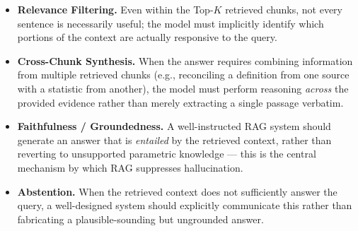 \documentclass[11pt,a4paper]{article}
\begin{document}
\begin{itemize}
  \item \textbf{Relevance Filtering.} Even within the Top-$K$ retrieved chunks, not every sentence is necessarily useful; the model must implicitly identify which portions of the context are actually responsive to the query.
  \item \textbf{Cross-Chunk Synthesis.} When the answer requires combining information from multiple retrieved chunks (e.g., reconciling a definition from one source with a statistic from another), the model must perform reasoning \emph{across} the provided evidence rather than merely extracting a single passage verbatim.
  \item \textbf{Faithfulness / Groundedness.} A well-instructed RAG system should generate an answer that is \emph{entailed} by the retrieved context, rather than reverting to unsupported parametric knowledge --- this is the central mechanism by which RAG suppresses hallucination.
  \item \textbf{Abstention.} When the retrieved context does not sufficiently answer the query, a well-designed system should explicitly communicate this rather than fabricating a plausible-sounding but ungrounded answer.
\end{itemize}
\end{document}
